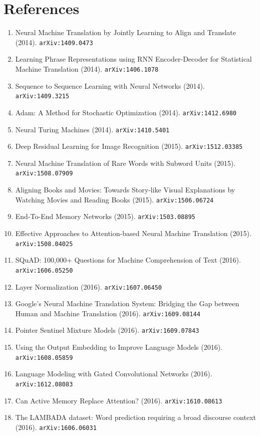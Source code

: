 \documentclass[11pt]{article}
\begin{document}
\section*{References}
\begin{enumerate}\small
  \item Neural Machine Translation by Jointly Learning to Align and Translate (2014). \texttt{arXiv:1409.0473}
  \item Learning Phrase Representations using RNN Encoder-Decoder for
  Statistical Machine Translation (2014). \texttt{arXiv:1406.1078}
  \item Sequence to Sequence Learning with Neural Networks (2014). \texttt{arXiv:1409.3215}
  \item Adam: A Method for Stochastic Optimization (2014). \texttt{arXiv:1412.6980}
  \item Neural Turing Machines (2014). \texttt{arXiv:1410.5401}
  \item Deep Residual Learning for Image Recognition (2015). \texttt{arXiv:1512.03385}
  \item Neural Machine Translation of Rare Words with Subword Units (2015). \texttt{arXiv:1508.07909}
  \item Aligning Books and Movies: Towards Story-like Visual Explanations by
  Watching Movies and Reading Books (2015). \texttt{arXiv:1506.06724}
  \item End-To-End Memory Networks (2015). \texttt{arXiv:1503.08895}
  \item Effective Approaches to Attention-based Neural Machine Translation (2015). \texttt{arXiv:1508.04025}
  \item SQuAD: 100,000+ Questions for Machine Comprehension of Text (2016). \texttt{arXiv:1606.05250}
  \item Layer Normalization (2016). \texttt{arXiv:1607.06450}
  \item Google's Neural Machine Translation System: Bridging the Gap between
  Human and Machine Translation (2016). \texttt{arXiv:1609.08144}
  \item Pointer Sentinel Mixture Models (2016). \texttt{arXiv:1609.07843}
  \item Using the Output Embedding to Improve Language Models (2016). \texttt{arXiv:1608.05859}
  \item Language Modeling with Gated Convolutional Networks (2016). \texttt{arXiv:1612.08083}
  \item Can Active Memory Replace Attention? (2016). \texttt{arXiv:1610.08613}
  \item The LAMBADA dataset: Word prediction requiring a broad discourse context (2016). \texttt{arXiv:1606.06031}

\end{enumerate}
\end{document}
